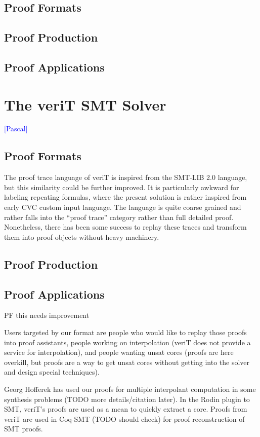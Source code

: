 \documentclass{llncs}
\newcommand{\Note}[1]{\textcolor{blue}{[#1]}}
\begin{document}
\subsection{Proof Formats}
\subsection{Proof Production}
\subsection{Proof Applications}

\section{The veriT SMT Solver}
\Note{Pascal}
\subsection{Proof Formats}

The proof trace language of veriT is inspired from the SMT-LIB 2.0 language, but this similarity could be further improved.  It is particularly awkward for labeling repeating formulas, where the present solution is rather inspired from early CVC custom input language.  The language is quite coarse grained and rather falls into the ``proof trace'' category rather than full detailed proof.  Nonetheless, there has been some success to replay these traces and transform them into proof objects without heavy machinery.


\subsection{Proof Production}
\subsection{Proof Applications}

PF this needs improvement

Users targeted by our format are people who would like to replay those proofs into proof assistants, people working on interpolation (veriT does not provide a service for interpolation), and people wanting unsat cores (proofs are here overkill, but proofs are a way to get unsat cores without getting into the solver and design special techniques).

Georg Hofferek has used our proofs for multiple interpolant computation in some synthesis problems (TODO more details/citation later).  In the Rodin plugin to SMT, veriT's proofs are used as a mean to quickly extract a core.  Proofs from veriT are used in Coq-SMT (TODO should check) for proof reconstruction of SMT proofs.
\end{document}
